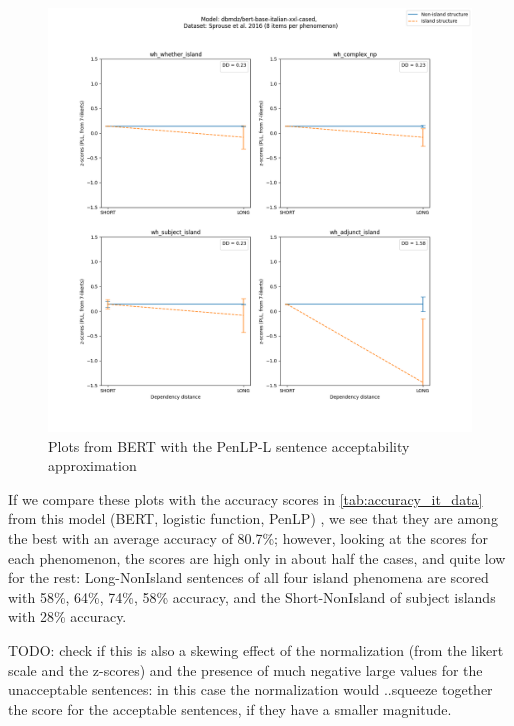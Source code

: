\begin{figure}[H]
	\centering
	\includegraphics[width=1\textwidth]{images/AppendixA/Sprouse_wh_dbmdz_bert-base-italian-xxl-cased_PLL-zscores-likert-2022-07-11.png} 
	\caption{Plots from BERT with the PenLP-L sentence acceptability approximation}
	\label{fig:bert_penlp_l_sprouse}
\end{figure}

If we compare these plots with the accuracy scores in \autoref{tab:accuracy_it_data} from this model (BERT, logistic function, PenLP) , we see that they are among the best with an average accuracy of 80.7\%; however, looking at the scores for each phenomenon, the scores are high only in about half the cases, and quite low for the rest: Long-NonIsland sentences of all four island phenomena are scored with 58\%, 64\%, 74\%, 58\% accuracy, and the Short-NonIsland of subject islands with 28\% accuracy.

TODO: check if this is also a skewing effect of the normalization (from the likert scale and the z-scores) and the presence of much negative large values for the unacceptable sentences: in this case the normalization would ..squeeze together the score for the acceptable sentences, if they have a smaller magnitude.


